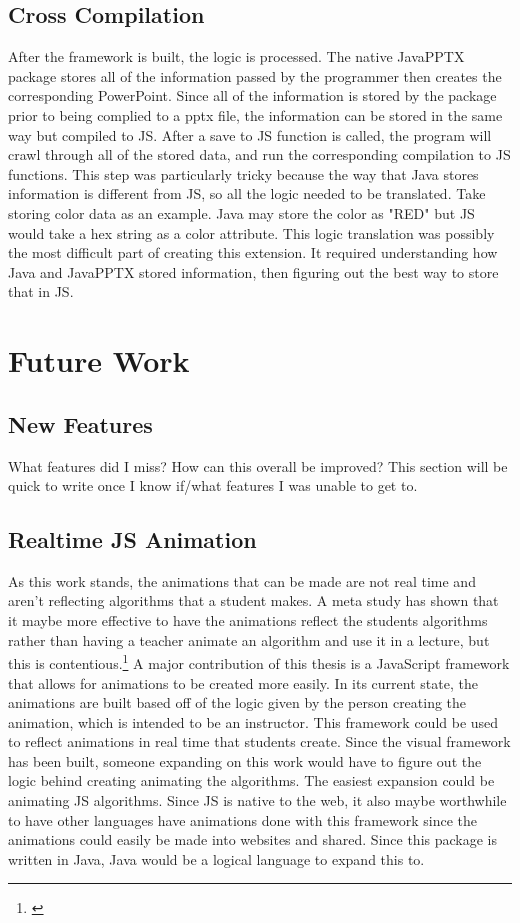 \documentclass[12pt,twoside]{reedthesis}
\begin{document}
\subsection{Cross Compilation}
After the framework is built, the logic is processed. The native JavaPPTX package stores all of the information passed by the programmer then creates the corresponding PowerPoint. Since all of the information is stored by the package prior to being complied to a pptx file, the information can be stored in the same way but compiled to JS. After a save to JS function is called, the program will crawl through all of the stored data, and run the corresponding compilation to JS functions. This step was particularly tricky because the way that Java stores information is different from JS, so all the logic needed to be translated. Take storing color data as an example. Java may store the color as "RED" but JS would take a hex string as a color attribute. This logic translation was possibly the most difficult part of creating this extension. It required understanding how Java and  JavaPPTX stored information, then figuring out the best way to store that in JS. 

\section{Future Work}

\subsection{New Features}
What features did I miss? How can this overall be improved? This section will be quick to write once I know if/what features I was unable to get to. 

\subsection{Realtime JS Animation}
As this work stands, the animations that can be made are not real time and aren't reflecting algorithms that a student makes. A meta study has shown that it maybe more effective to have the animations reflect the students algorithms rather than having a teacher animate an algorithm and use it in a lecture, but this is contentious.\footnote{\cite{hundhausen_meta-study_2002}} A major contribution of this thesis is a JavaScript framework that allows for animations to be created more easily. In its current state, the animations are built based off of the logic given by the person creating the animation, which is intended to be an instructor. This framework could be used to reflect animations in real time that students create. Since the visual framework has been built, someone expanding on this work would have to figure out the logic behind creating animating the algorithms. The easiest expansion could be animating JS algorithms. Since JS is native to the web, it also maybe worthwhile to have other languages have animations done with this framework since the animations could easily be made into websites and shared. Since this package is written in Java, Java would be a logical language to expand this to. 
\end{document}
